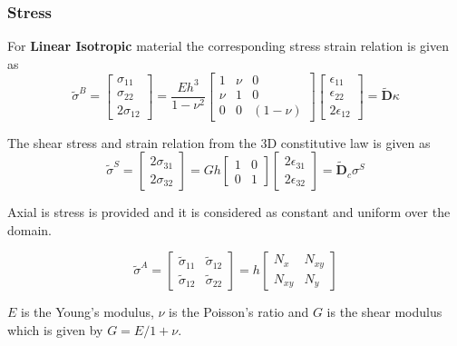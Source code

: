 \documentclass[9pt]{beamer}
\begin{document}
\begin{frame}
\frametitle{Stress}
For \textbf{Linear Isotropic} material the corresponding stress strain relation is given as
\begin{equation*}
\tilde{\sigma}^B = \begin{bmatrix}
\sigma_{11}
\\
\sigma_{22}
\\
2 \sigma_{12}
\end{bmatrix}
=\dfrac{Eh^3}{1-\nu^2}
\begin{bmatrix}
1 & \nu  & 0
\\
\nu  & 1 & 0
\\
0 & 0 & (1-\nu)
\end{bmatrix}
\begin{bmatrix}
\epsilon_{11}
\\
\epsilon_{22}
\\
2 \epsilon_{12}
\end{bmatrix}
=
\tilde{\mathbf{D}} \kappa
\end{equation*}


The shear stress and strain relation from the 3D constitutive law is given as
\begin{equation*}
\tilde{\sigma}^S = \begin{bmatrix}
2 \sigma_{31}
\\
2 \sigma_{32}
\end{bmatrix}
=Gh
\begin{bmatrix}
1 & 0 
\\
0 & 1 
\end{bmatrix}
\begin{bmatrix}
2\epsilon_{31}
\\
2\epsilon_{32}
\end{bmatrix}
=
\tilde{\mathbf{D}}_c
\sigma^S
\end{equation*}

Axial is stress is provided and it is considered as constant and uniform over the domain.

\begin{equation*}
\tilde{\sigma}^A = \begin{bmatrix}
\tilde{\sigma}_{11} & \tilde{\sigma}_{12}
\\
\tilde{\sigma}_{12} & \tilde{\sigma}_{22}
\end{bmatrix}
=h
\begin{bmatrix}
N_x & N_{xy}
\\
N_{xy} & N_y
\end{bmatrix}
\end{equation*}


$E$ is the Young's modulus, $\nu$ is the Poisson's ratio and $G$ is the shear modulus which is given by $G=E / 1+\nu $. 
\end{frame}
\end{document}
